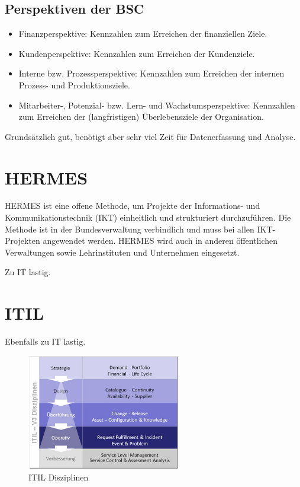\documentclass[]{scrreprt}
\begin{document}
    \subsection{Perspektiven der BSC}
    \begin{itemize}
        \item Finanzperspektive: Kennzahlen zum Erreichen der finanziellen Ziele.
        \item Kundenperspektive: Kennzahlen zum Erreichen der Kundenziele.
        \item Interne bzw. Prozessperspektive: Kennzahlen zum Erreichen der internen Prozess- und Produktionsziele.
        \item Mitarbeiter-, Potenzial- bzw. Lern- und Wachstumsperspektive: Kennzahlen zum Erreichen der (langfristigen) Überlebensziele der Organisation.
    \end{itemize}
    Grundsätzlich gut, benötigt aber sehr viel Zeit für Datenerfassung und Analyse.
    
    \section{HERMES}
    HERMES ist eine offene Methode, um Projekte der Informations- und Kommunikationstechnik (IKT) einheitlich und strukturiert durchzuführen. Die Methode ist in der Bundesverwaltung verbindlich und muss bei allen  IKT-Projekten angewendet werden. HERMES wird auch in anderen öffentlichen Verwaltungen sowie Lehrinstituten und Unternehmen eingesetzt.
    
    Zu IT lastig.
    
    \section{ITIL}
    Ebenfalls zu IT lastig.
    
    \begin{figure}[htbp]
    \begin{center}
    \includegraphics[width=0.6\textwidth,angle=0]{./itil.jpg}
    \caption{ITIL Disziplinen}
    \label{pic:itil}
    \end{center}
    \end{figure}
    
\end{document}
